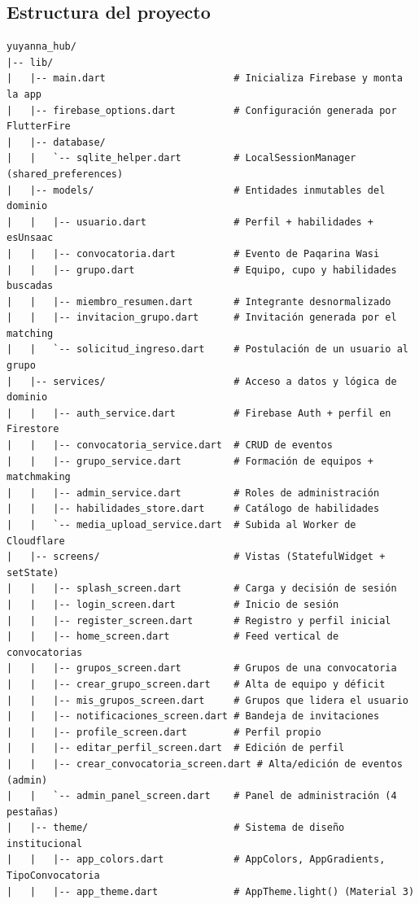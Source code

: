 \documentclass[12pt,a4paper]{article}
\begin{document}
\subsection{Estructura del proyecto}
{\small
\begin{verbatim}
yuyanna_hub/
|-- lib/
|   |-- main.dart                      # Inicializa Firebase y monta la app
|   |-- firebase_options.dart          # Configuración generada por FlutterFire
|   |-- database/
|   |   `-- sqlite_helper.dart         # LocalSessionManager (shared_preferences)
|   |-- models/                        # Entidades inmutables del dominio
|   |   |-- usuario.dart               # Perfil + habilidades + esUnsaac
|   |   |-- convocatoria.dart          # Evento de Paqarina Wasi
|   |   |-- grupo.dart                 # Equipo, cupo y habilidades buscadas
|   |   |-- miembro_resumen.dart       # Integrante desnormalizado
|   |   |-- invitacion_grupo.dart      # Invitación generada por el matching
|   |   `-- solicitud_ingreso.dart     # Postulación de un usuario al grupo
|   |-- services/                      # Acceso a datos y lógica de dominio
|   |   |-- auth_service.dart          # Firebase Auth + perfil en Firestore
|   |   |-- convocatoria_service.dart  # CRUD de eventos
|   |   |-- grupo_service.dart         # Formación de equipos + matchmaking
|   |   |-- admin_service.dart         # Roles de administración
|   |   |-- habilidades_store.dart     # Catálogo de habilidades
|   |   `-- media_upload_service.dart  # Subida al Worker de Cloudflare
|   |-- screens/                       # Vistas (StatefulWidget + setState)
|   |   |-- splash_screen.dart         # Carga y decisión de sesión
|   |   |-- login_screen.dart          # Inicio de sesión
|   |   |-- register_screen.dart       # Registro y perfil inicial
|   |   |-- home_screen.dart           # Feed vertical de convocatorias
|   |   |-- grupos_screen.dart         # Grupos de una convocatoria
|   |   |-- crear_grupo_screen.dart    # Alta de equipo y déficit
|   |   |-- mis_grupos_screen.dart     # Grupos que lidera el usuario
|   |   |-- notificaciones_screen.dart # Bandeja de invitaciones
|   |   |-- profile_screen.dart        # Perfil propio
|   |   |-- editar_perfil_screen.dart  # Edición de perfil
|   |   |-- crear_convocatoria_screen.dart # Alta/edición de eventos (admin)
|   |   `-- admin_panel_screen.dart    # Panel de administración (4 pestañas)
|   |-- theme/                         # Sistema de diseño institucional
|   |   |-- app_colors.dart            # AppColors, AppGradients, TipoConvocatoria
|   |   |-- app_theme.dart             # AppTheme.light() (Material 3)

\end{verbatim}}
\end{document}
